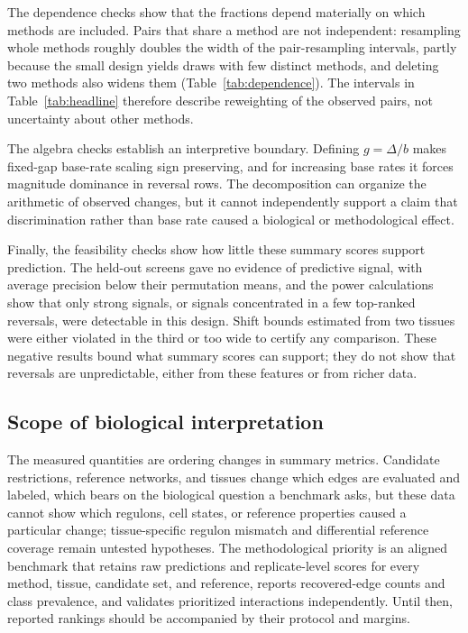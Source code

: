\documentclass[10pt,letterpaper]{article}
\begin{document}
The dependence checks show that the fractions depend materially on which methods are included. Pairs that share a method are not independent: resampling whole methods roughly doubles the width of the pair-resampling intervals, partly because the small design yields draws with few distinct methods, and deleting two methods also widens them (Table~\ref{tab:dependence}). The intervals in Table~\ref{tab:headline} therefore describe reweighting of the observed pairs, not uncertainty about other methods.

The algebra checks establish an interpretive boundary. Defining $g=\Delta/b$ makes fixed-gap base-rate scaling sign preserving, and for increasing base rates it forces magnitude dominance in reversal rows. The decomposition can organize the arithmetic of observed changes, but it cannot independently support a claim that discrimination rather than base rate caused a biological or methodological effect.

Finally, the feasibility checks show how little these summary scores support prediction. The held-out screens gave no evidence of predictive signal, with average precision below their permutation means, and the power calculations show that only strong signals, or signals concentrated in a few top-ranked reversals, were detectable in this design. Shift bounds estimated from two tissues were either violated in the third or too wide to certify any comparison. These negative results bound what summary scores can support; they do not show that reversals are unpredictable, either from these features or from richer data.

\subsection*{Scope of biological interpretation}
The measured quantities are ordering changes in summary metrics. Candidate restrictions, reference networks, and tissues change which edges are evaluated and labeled, which bears on the biological question a benchmark asks, but these data cannot show which regulons, cell states, or reference properties caused a particular change; tissue-specific regulon mismatch and differential reference coverage remain untested hypotheses. The methodological priority is an aligned benchmark that retains raw predictions and replicate-level scores for every method, tissue, candidate set, and reference, reports recovered-edge counts and class prevalence, and validates prioritized interactions independently. Until then, reported rankings should be accompanied by their protocol and margins.
\end{document}
